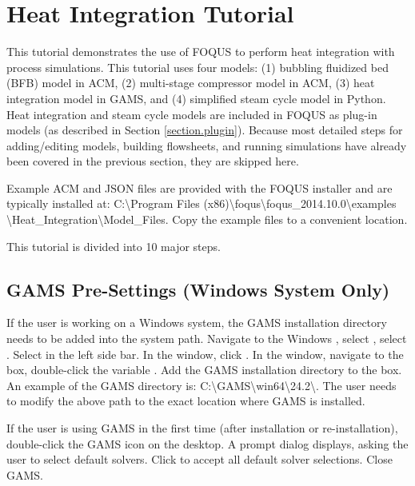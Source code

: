 \section{Heat Integration Tutorial}
\label{sec.hi.tut}
This tutorial demonstrates the use of FOQUS to perform heat integration with process simulations. This tutorial uses four models: (1) bubbling fluidized bed (BFB) model in ACM, (2) multi-stage compressor model in ACM, (3) heat integration model in GAMS, and (4) simplified steam cycle model in Python. Heat integration and steam cycle models are included in FOQUS as plug-in models (as described in Section \ref{section.plugin}). Because most detailed steps for adding/editing models, building flowsheets, and running simulations have already been covered in the previous section, they are skipped here. 

Example ACM and JSON files are provided with the FOQUS installer and are typically installed at: C:\textbackslash Program Files (x86)\textbackslash foqus\textbackslash foqus\_2014.10.0\textbackslash examples \textbackslash Heat\_Integration\textbackslash Model\_Files.  Copy the example files to a convenient location.

This tutorial is divided into 10 major steps.

\subsection{GAMS Pre-Settings (Windows System Only)}

If the user is working on a Windows system, the GAMS installation directory needs to be added into the system path. Navigate to the Windows , select , select . Select  in the left side bar. In the  window, click . In the  window, navigate to the  box,  double-click the variable . Add the GAMS installation directory to the  box. An example of the GAMS directory is: C:\textbackslash GAMS\textbackslash win64\textbackslash 24.2\textbackslash. The user needs to modify the above path to the exact location where GAMS is installed.

If the user is using GAMS in the first time (after installation or re-installation), double-click the GAMS icon on the desktop. A prompt dialog displays, asking the user to select default solvers. Click  to accept all default solver selections. Close GAMS.

